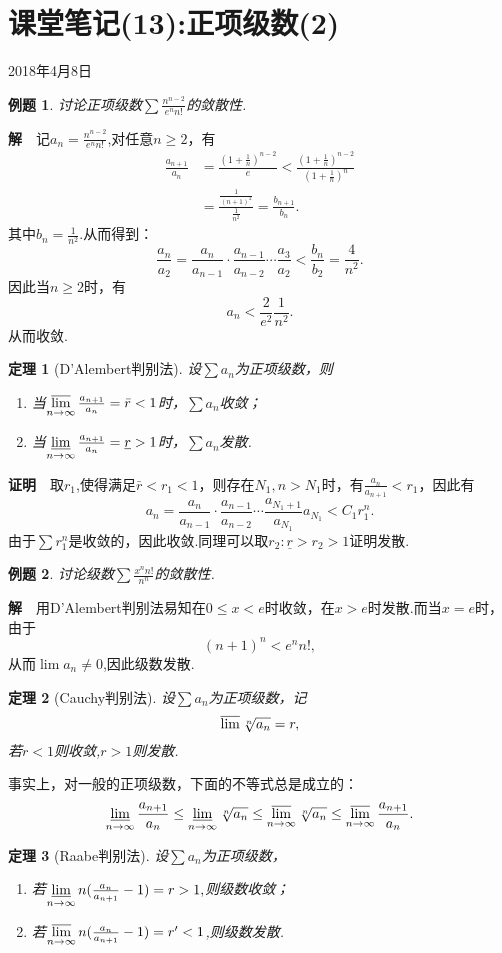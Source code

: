 \documentclass[UTF8]{article}
\newcommand{\zm}{\textbf{证明}$\quad$}
\newcommand{\jie}{\textbf{解}$\quad$}
\newtheorem{thm}{\hspace{2em}定理}[section]
\newtheorem{exa}{\hspace{2em}例题}[section]
\begin{document}
\section{课堂笔记(13):正项级数(2)}
\begin{center}
  2018年4月8日
\end{center}
\begin{exa}
  讨论正项级数$\sum\frac{n^{n-2}}{e^nn!}$的敛散性.
\end{exa}
\jie 记$a_n=\frac{n^{n-2}}{e^nn!}$,对任意$n\ge2$，有
\begin{align*}
  \frac{a_{n+1}}{a_n}&=\frac{(1+\frac{1}{n})^{n-2}}{e}<\frac{(1+\frac{1}{n})^{n-2}}{(1+\frac{1}{n})^n}\\
  &=\frac{\frac{1}{(n+1)^2}}{\frac{1}{n^2}}=\frac{b_{n+1}}{b_n}.
\end{align*}
其中$b_n=\frac{1}{n^2}.$从而得到：
\[
  \frac{a_n}{a_2}=\frac{a_n}{a_{n-1}}\cdot\frac{a_{n-1}}{a_{n-2}}\cdots\frac{a_3}{a_2}
  <\frac{b_n}{b_2}=\frac{4}{n^2}.
\]
因此当$n\ge2$时，有
$$a_n<\frac{2}{e^2}\frac{1}{n^2}.$$从而收敛.
\begin{thm}[D'Alembert判别法]
  设$\sum a_n$为正项级数，则
  \begin{enumerate}
    \item 当$\varlimsup\limits_{n\to\infty}\frac{a_{n+1}}{a_n}=\bar{r}<1$时，$\sum a_n$收敛；
    \item 当$\varliminf\limits_{n\to\infty}\frac{a_{n+1}}{a_n}=\underline{r}>1$时，$\sum a_n$发散.
  \end{enumerate}
\end{thm}
\zm 取$r_1$,使得满足$\bar{r}<r_1<1$，则存在$N_1,n>N_1$时，有$\frac{a_n}{a_{n+1}}<r_1$，因此有
$$a_n=\frac{a_n}{a_{n-1}}\cdot\frac{a_{n-1}}{a_{n-2}}\cdots\frac{a_{N_1+1}}{a_{N_1}}a_{N_1}<C_1r_1^n.$$
由于$\sum r_1^n$是收敛的，因此收敛.同理可以取$r_2:\underline{r}>r_2>1$证明发散.
\begin{exa}
  讨论级数$\sum\frac{x^nn!}{n^n}$的敛散性.
\end{exa}
\jie 用D'Alembert判别法易知在$0\le x<e$时收敛，在$x>e$时发散.而当$x=e$时，由于
$$(n+1)^n<e^nn!,$$
从而$\lim a_n\ne0$,因此级数发散.
\begin{thm}[Cauchy判别法]
  设$\sum a_n$为正项级数，记
  $$\varlimsup\sqrt[n]{a_n}=r,$$
  若$r<1$则收敛,$r>1$则发散.
\end{thm}
事实上，对一般的正项级数，下面的不等式总是成立的：
$$\varliminf_{n\to\infty}\frac{a_{n+1}}{a_n}\le\varliminf_{n\to\infty}\sqrt[n]{a_n}\le
\varlimsup_{n\to\infty}\sqrt[n]{a_n}\le\varlimsup_{n\to\infty}\frac{a_{n+1}}{a_n}.$$
\begin{thm}[Raabe判别法]
  设$\sum a_n$为正项级数，
  \begin{enumerate}
    \item 若$\varliminf\limits_{n\to\infty}n(\frac{a_{n}}{a_{n+1}}-1)=r>1,$则级数收敛；
    \item 若$\varlimsup\limits_{n\to\infty}n(\frac{a_{n}}{a_{n+1}}-1)=r'<1$,则级数发散.
  \end{enumerate}
\end{thm}
\end{document}
